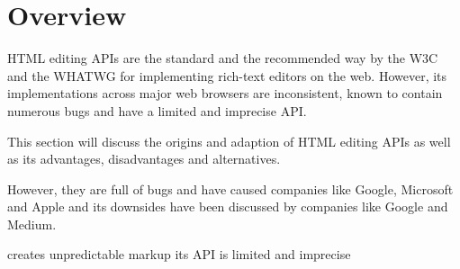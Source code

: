 \chapter{Overview}




HTML editing APIs are the standard and the recommended way by the W3C and the WHATWG for implementing rich-text editors on the web. However, its implementations across major web browsers are inconsistent, known to contain numerous bugs and have a limited and imprecise API.

This section will discuss the origins and adaption of HTML editing APIs as well as its advantages, disadvantages and alternatives.




However, they are full of bugs and have caused companies like Google, Microsoft and Apple and its downsides have been discussed by companies like Google and Medium.

creates unpredictable markup
its API is limited and imprecise